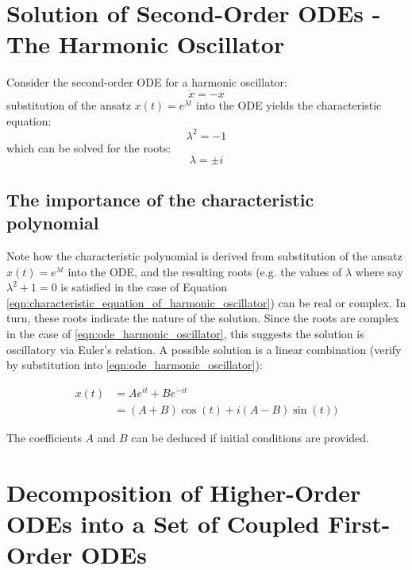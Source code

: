 \documentclass[a4paper,11pt,landscape]{article}
\begin{document}
\section{Solution of Second-Order ODEs - The Harmonic Oscillator}

Consider the second-order ODE for a harmonic oscillator:
\begin{equation} \label{eqn:ode_harmonic_oscillator} 
    \ddot{x} = -x
\end{equation}
substitution of the ansatz $x(t)=e^{\lambda t}$ into the ODE yields the characteristic equation:
\begin{equation} \label{eqn:characteristic_equation_of_harmonic_oscillator} 
    \lambda^2 = -1
\end{equation}
which can be solved for the roots:
\begin{equation} \label{eqn:complex_roots}
    \lambda = \pm i
\end{equation}




\subsection{The importance of the characteristic polynomial}

Note how the characteristic polynomial is derived from substitution of the ansatz $x(t)=e^{\lambda t}$ into the ODE, and the resulting roots (e.g. the values of $\lambda$ where say $\lambda^2 + 1 = 0$ is satisfied in the case of Equation \eqref{eqn:characteristic_equation_of_harmonic_oscillator}) can be real or complex.  In turn, these roots indicate the nature of the solution.  Since the roots are complex in the case of \eqref{eqn:ode_harmonic_oscillator}, this suggests the solution is oscillatory via Euler's relation.  A possible solution is a linear combination (verify by substitution into \eqref{eqn:ode_harmonic_oscillator}):

\begin{equation} \label{eqn:solution_ode_harmonic_oscillator}
\begin{split}
x(t) & = A e^{it} + B e^{-it} \\
     & = (A + B) \cos(t) + i(A - B) \sin(t))
\end{split}
\end{equation}

The coefficients $A$ and $B$ can be deduced if initial conditions are provided.

\section{Decomposition of Higher-Order ODEs into a Set of Coupled First-Order ODEs}
\end{document}
